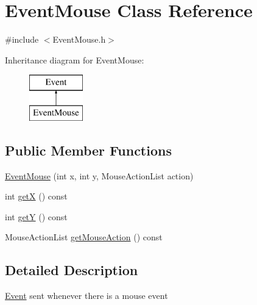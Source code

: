 \hypertarget{class_event_mouse}{\section{Event\+Mouse Class Reference}
\label{class_event_mouse}
}


{\ttfamily \#include $<$Event\+Mouse.\+h$>$}

Inheritance diagram for Event\+Mouse\+:\begin{figure}[H]
\begin{center}
\leavevmode
\includegraphics[height=2.000000cm]{class_event_mouse}
\end{center}
\end{figure}
\subsection*{Public Member Functions}
\begin{DoxyCompactItemize}
\item 
\hyperlink{class_event_mouse_a57af369efaecf3f4c4ded4d3543720cb}{Event\+Mouse} (int x, int y, Mouse\+Action\+List action)
\item 
int \hyperlink{class_event_mouse_a9cc157a57d229748d2261ef05df16188}{get\+X} () const 
\item 
int \hyperlink{class_event_mouse_a5a23acf16c866cf5c8adc9ffcf2445be}{get\+Y} () const 
\item 
Mouse\+Action\+List \hyperlink{class_event_mouse_a8172862dd288ce9555b486f542ed2fe3}{get\+Mouse\+Action} () const 
\end{DoxyCompactItemize}


\subsection{Detailed Description}
\hyperlink{class_event}{Event} sent whenever there is a mouse event 

